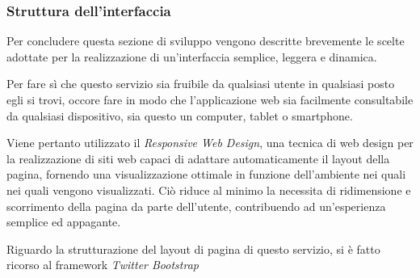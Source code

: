 \subsubsection{Struttura dell'interfaccia} %
\label{ssub:struttura_dell_interfaccia}

Per concludere questa sezione di sviluppo vengono descritte brevemente le scelte adottate per la realizzazione di un'interfaccia semplice, leggera e dinamica.

Per fare sì che questo servizio sia fruibile da qualsiasi utente in qualsiasi posto egli si trovi, occore fare in modo che l'applicazione web sia facilmente consultabile da qualsiasi dispositivo, sia questo un computer, tablet o smartphone.

Viene pertanto utilizzato il {\itshape Responsive Web Design}, una tecnica di web design per la realizzazione di siti web capaci di adattare automaticamente il layout della pagina, fornendo una visualizzazione ottimale in funzione dell'ambiente nei quali nei quali vengono visualizzati. Ciò riduce al minimo la necessita di ridimensione e scorrimento della pagina da parte dell'utente, contribuendo ad un'esperienza semplice ed appagante.
\vspace{0.5cm}

Riguardo la strutturazione del layout di pagina di questo servizio, si è fatto ricorso al framework {\itshape Twitter Bootstrap}


